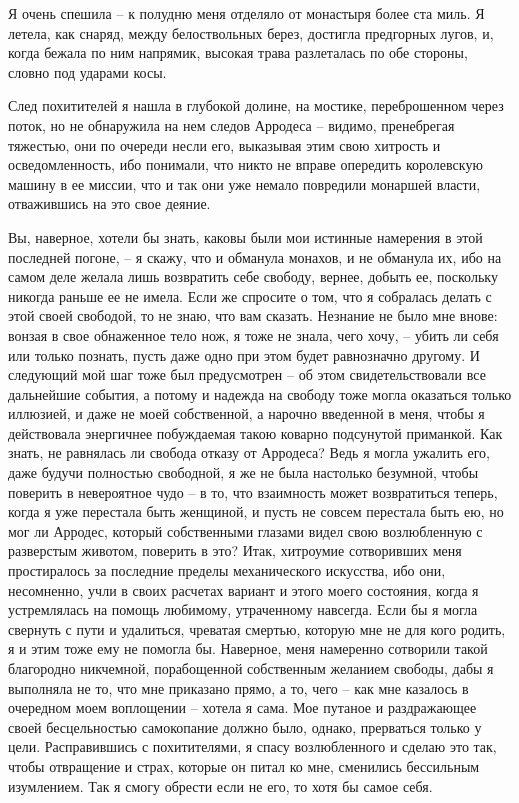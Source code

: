 Я очень спешила -- к полудню меня отделяло от монастыря более ста миль.
Я летела,  как снаряд, между белоствольных берез, достигла предгорных лугов,
и, когда бежала по ним напрямик, высокая трава разлеталась по  обе  стороны,
словно под ударами косы.

След  похитителей  я нашла в глубокой долине, на мостике, переброшенном
через поток, но не обнаружила на нем следов Арродеса -- видимо,  пренебрегая
тяжестью,  они  по  очереди  несли  его,  выказывая  этим  свою  хитрость  и
осведомленность, ибо понимали, что никто  не  вправе  опередить  королевскую
машину  в  ее  миссии,  что  и так они уже немало повредили монаршей власти,
отважившись на это свое деяние.

Вы, наверное, хотели бы знать, каковы были  мои  истинные  намерения  в
этой последней погоне, -- я скажу, что и обманула монахов, и не обманула их,
ибо  на  самом  деле желала лишь возвратить себе свободу, вернее, добыть ее,
поскольку никогда раньше ее  не  имела.  Если  же  спросите  о  том,  что  я
собралась  делать  с  этой  своей  свободой,  то  не  знаю, что вам сказать.
Незнание не было мне внове: вонзая в свое обнаженное тело  нож,  я  тоже  не
знала,  чего  хочу, -- убить ли себя или только познать, пусть даже одно при
этом будет равнозначно другому. И следующий мой шаг тоже был предусмотрен --
об этом свидетельствовали все дальнейшие события,  а  потому  и  надежда  на
свободу  тоже могла оказаться только иллюзией, и даже не моей собственной, а
нарочно введенной в меня, чтобы я действовала энергичнее  побуждаемая  такою
коварно  подсунутой  приманкой. Как знать, не равнялась ли свобода отказу от
Арродеса? Ведь я могла ужалить его, даже будучи полностью свободной, я же не
была настолько безумной, чтобы поверить в невероятное  чудо  --  в  то,  что
взаимность может возвратиться теперь, когда я уже перестала быть женщиной, и
пусть  не  совсем перестала быть ею, но мог ли Арродес, который собственными
глазами видел свою возлюбленную с разверстым животом, поверить в это?  Итак,
хитроумие  сотворивших  меня простиралось за последние пределы механического
искусства, ибо они, несомненно, учли в своих расчетах вариант и этого  моего
состояния,  когда  я  устремлялась на помощь любимому, утраченному навсегда.
Если бы я могла свернуть с пути и удалиться, чреватая смертью,  которую  мне
не  для  кого  родить,  я  и  этим  тоже  ему  не помогла бы. Наверное, меня
намеренно сотворили такой  благородно  никчемной,  порабощенной  собственным
желанием  свободы,  дабы  я  выполняла не то, что мне приказано прямо, а то,
чего -- как мне казалось в очередном моем воплощении -- хотела я  сама.  Мое
путаное  и раздражающее своей бесцельностью самокопание должно было, однако,
прерваться  только  у  цели.   Расправившись   с   похитителями,   я   спасу
возлюбленного  и  сделаю это так, чтобы отвращение и страх, которые он питал
ко мне, сменились бессильным изумлением. Так я смогу обрести если не его, то
хотя бы самое себя.

